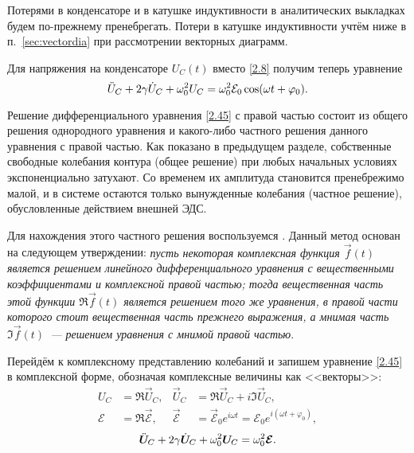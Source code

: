 Потерями в конденсаторе и в катушке индуктивности в аналитических выкладках
будем по-прежнему пренебрегать.
Потери в катушке индуктивности учтём ниже в п.~\ref{sec:vectordia} 
при рассмотрении векторных диаграмм.

Для напряжения на конденсаторе $U_C(t)$ вместо \eqref{2.8} получим теперь
уравнение
\begin{equation}\eqmark{2.45}
\ddot{U}_C+2\gamma \dot{U}_C+\omega_0^2U_C=\omega_0^2\mathcal{E}_0\cos(\omega t+
\varphi_0).
\end{equation}


Решение  дифференциального уравнения \eqref{2.45} с правой
частью состоит из общего решения однородного уравнения и какого-либо частного
решения данного уравнения с правой частью. Как показано в предыдущем разделе,
собственные свободные колебания контура (общее решение) при любых начальных
условиях экспоненциально затухают. Со временем их амплитуда становится
пренебрежимо малой, и в системе остаются только вынужденные колебания (частное
решение), обусловленные действием внешней ЭДС. 

Для нахождения этого частного
решения воспользуемся . Данный метод
основан на следующем утверждении: \emph{пусть некоторая комплексная функция
$\vec{f}(t)$ является решением линейного дифференциального уравнения 
с вещественными коэффициентами и комплексной правой частью; 
тогда вещественная часть этой 
функции $\Re \vec{f}(t)$ является решением того же уравнения, 
в правой части которого стоит вещественная часть прежнего выражения, 
а мнимая часть $\Im \vec{f}(t)$~--- решением уравнения с мнимой правой частью}.

Перейдём к комплексному представлению 
колебаний и запишем уравнение \eqref{2.45} в комплексной форме, 
обозначая комплексные величины как <<векторы>>:
\begin{equation}
\begin{aligned}
U_C &= \Re \vec{U}_{\! C}, & \vec{U}_{\! C} &= \Re \vec{U}_{\! C}+i\Im \vec{U}_{\! C}, \\
\mathcal{E}&=\Re \vec{\mathcal{E}}, & \vec{\mathcal{E}}&=
\vec{\mathcal{E}}_0e^{i\omega t}=\mathcal{E}_0 e^{i(\omega t+\varphi_0)},
\end{aligned}
\end{equation}
\begin{equation}\eqmark{2.46}
\ddot{\vec U}_{\! C}+2\gamma\dot{\vec U}_{\! C}+
\omega_0^2 \vec{U}_{\! C}=\omega_0^2\vec{\mathcal{E}}.
\end{equation}

